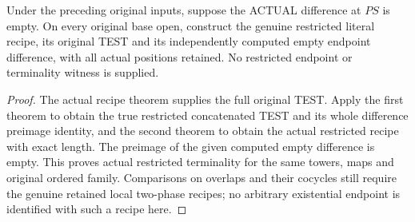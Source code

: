 \begin{theorem}
\label{hir:sharp-original-curve-terminal-difference-recipe-open-restriction}
\leanok
Under the preceding original inputs, suppose the ACTUAL difference at
$PS$ is empty. On every original base open, construct the genuine
restricted literal recipe, its original TEST and its independently
computed empty endpoint difference, with all actual positions retained.
No restricted endpoint or terminality witness is supplied.
\end{theorem}
\begin{proof}
The actual recipe theorem supplies the full original TEST. Apply the
first theorem to obtain the true restricted concatenated TEST and its
whole difference preimage identity, and the second theorem to obtain
the actual restricted recipe with exact length. The preimage of the
given computed empty difference is empty. This proves actual restricted
terminality for the same towers, maps and original ordered family.
Comparisons on overlaps and their cocycles still require the genuine
retained local two-phase recipes; no arbitrary existential endpoint is
identified with such a recipe here.
\end{proof}
